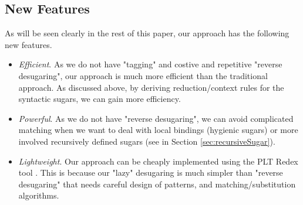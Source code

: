 \subsection{New Features}

As will be seen clearly in the rest of this paper, our approach has the following new features.
\begin{itemize}
  \item {\em Efficient}. As we do not have "tagging" and costive and repetitive "reverse desugaring", our approach is much more efficient than the traditional approach. As discussed above, by deriving reduction/context rules for the syntactic sugars, we can gain more efficiency.

  \item {\em Powerful}. As we do not have "reverse desugaring", we can avoid complicated matching when we want to deal with local bindings (hygienic sugars) or more involved recursively defined sugars (see  in Section \ref{sec:recursiveSugar}).

  \item {\em Lightweight}. Our approach can be cheaply implemented using the PLT Redex tool \cite{SEwPR}. This is because our "lazy" desugaring is much simpler than "reverse desugaring" that needs careful design of patterns, and matching/substitution algorithms.

\end{itemize}
